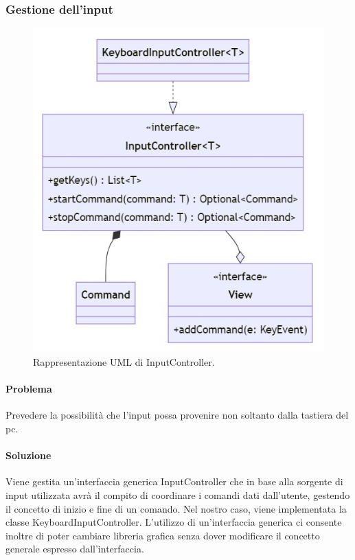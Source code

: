 \documentclass[a4paper,12pt]{report}
\begin{document}
\subsubsection*{Gestione dell’input}
%
\begin{figure}[H]
	\centering{}
	\includegraphics[scale=0.40]{img/input.jpg}
	\caption{Rappresentazione UML di InputController.}
	\end{figure}
%
\paragraph*{Problema} Prevedere la possibilità che l’input possa provenire non soltanto dalla tastiera del pc.
\paragraph*{Soluzione} Viene gestita un’interfaccia generica InputController che in base alla sorgente di input utilizzata avrà il compito di coordinare i comandi dati dall’utente, gestendo il concetto di inizio e fine di un comando. Nel nostro caso, viene implementata la classe KeyboardInputController. L’utilizzo di un’interfaccia generica ci consente inoltre di poter cambiare libreria grafica senza dover modificare il concetto generale espresso dall’interfaccia.
%
\newpage
\end{document}

